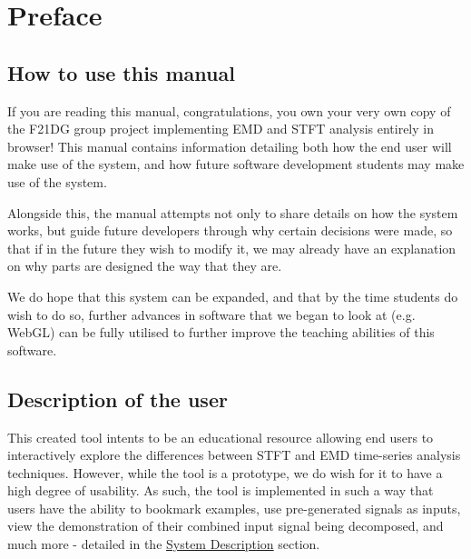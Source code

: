 \section{Preface}

\subsection{How to use this manual}

If you are reading this manual, congratulations, you own your very own copy of the F21DG group project implementing EMD and STFT analysis entirely in browser! 
This manual contains information detailing both how the end user will make use of the system, and how future software development students may make use of the system.

Alongside this, the manual attempts not only to share details on how the system works, but guide future developers through why certain decisions were made, 
so that if in the future they wish to modify it, we may already have an explanation on why parts are designed the way that they are. 

We do hope that this system can be expanded, and that by the time students do wish to do so, further advances in software that we began to look at (e.g. WebGL)
can be fully utilised to further improve the teaching abilities of this software.

\subsection{Description of the user}

This created tool intents to be an educational resource allowing end users to interactively explore the differences between STFT and EMD time-series analysis techniques.
However, while the tool is a prototype, we do wish for it to have a high degree of usability. As such, the tool is implemented in such a way that users have the 
ability to bookmark examples, use pre-generated signals as inputs, view the demonstration of their combined input signal being decomposed, and much more - detailed in 
the \hyperref[systemdesc]{System Description} section.

\newpage